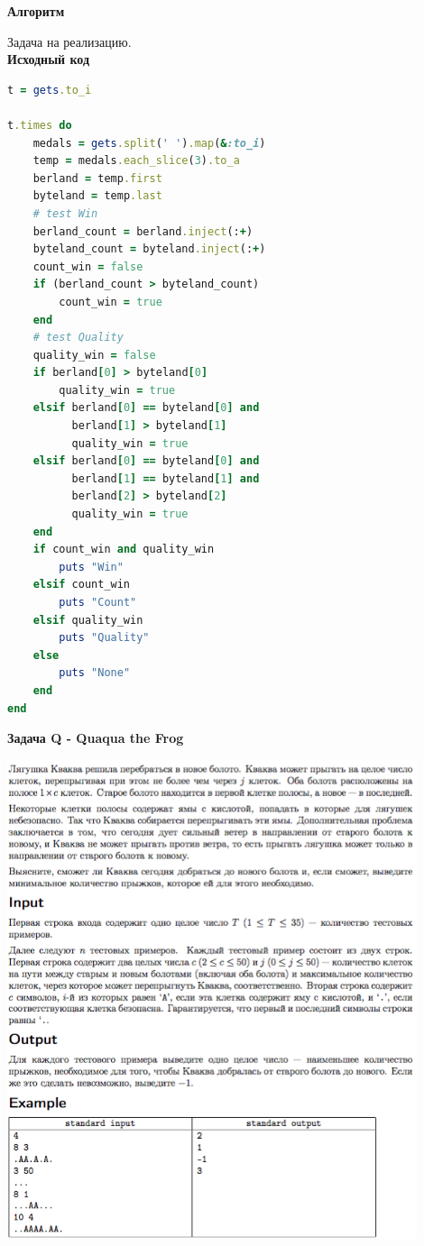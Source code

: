 \documentclass[a4paper,12pt]{article}
\begin{document}
\textbf{{\large Алгоритм}}

Задача на реализацию. \\
\newpage
\textbf{{\large Исходный код}} \\
\begin{lstlisting}[language=Ruby]
t = gets.to_i

t.times do
    medals = gets.split(' ').map(&:to_i)
    temp = medals.each_slice(3).to_a
    berland = temp.first
    byteland = temp.last
    # test Win
    berland_count = berland.inject(:+)
    byteland_count = byteland.inject(:+)
    count_win = false
    if (berland_count > byteland_count)
        count_win = true
    end
    # test Quality
    quality_win = false
    if berland[0] > byteland[0]
        quality_win = true
    elsif berland[0] == byteland[0] and
          berland[1] > byteland[1]
          quality_win = true
    elsif berland[0] == byteland[0] and
          berland[1] == byteland[1] and
          berland[2] > byteland[2]
          quality_win = true
    end
    if count_win and quality_win
        puts "Win"
    elsif count_win
        puts "Count"
    elsif quality_win
        puts "Quality"
    else
        puts "None"
    end
end
\end{lstlisting}



\newpage
\textbf{{\large Задача Q - Quaqua the Frog}}

\begin{center}
\includegraphics[width=0.9\textwidth]{OC_Bashkortostan/Q.png}\\ [1cm]
\end{center}
\end{document}
